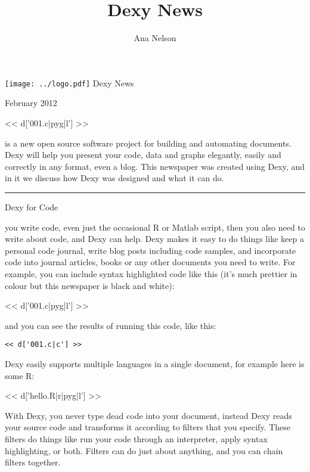 \documentclass[custom, plainsections]{sciposter}
\title{Dexy News}
\author{Ana Nelson}
\begin{document}
\rmfamily

\begin{megasize}
\texttt{[image: ../logo.pdf]}
\hspace{0.7in}
Dexy News
\end{megasize} \hfill February 2012


\begin{multicols*}{3}

\small
<< d['001.c|pyg|l'] >>

\vspace{0.5cm}

 is a new open source software project for building and automating documents. Dexy will help you present your code, data and graphs elegantly, easily and correctly in any format, even a blog. This newspaper was created using Dexy, and in it we discuss how Dexy was designed and what it can do.

\vspace{10pt}
\hrule
\vspace{10pt}

\large
Dexy for Code
\small

\vspace{5pt}

 you write code, even just the occasional R or Matlab script, then you also need to write about code, and Dexy can help. Dexy makes it easy to do things like keep a personal code journal, write blog posts including code samples, and incorporate code into journal articles, books or any other documents you need to write. For example, you can include syntax highlighted code like this (it's much prettier in colour but this newspaper is black and white):

<< d['001.c|pyg|l'] >>

\noindent and you can see the results of running this code, like this:

\begin{Verbatim}
<< d['001.c|c'] >>
\end{Verbatim}

Dexy easily supports multiple languages in a single document, for example here is some R:

<< d['hello.R|r|pyg|l'] >>

With Dexy, you never type dead code into your document, instead Dexy reads your source code and transforms it according to filters that you specify. These filters do things like run your code through an interpreter, apply syntax highlighting, or both. Filters can do just about anything, and you can chain filters together.



\end{multicols*}
\end{document}
